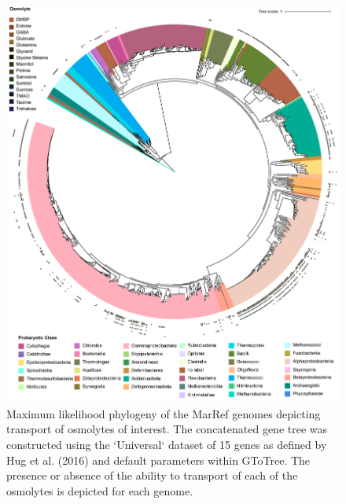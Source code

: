 \documentclass[utf8]{frontiers_suppmat} %
\begin{document}
\begin{figure}[ht]
    \centering
    \includegraphics[width=0.9\columnwidth]{Figures/SI-Bacterial-Phylogeny-Transport-01-01.png}
    \caption{Maximum likelihood phylogeny of the MarRef genomes depicting transport of osmolytes of interest. The concatenated gene tree was constructed using the `Universal` dataset of 15 genes as defined by Hug et al. (2016) and default parameters within GToTree. The presence or absence of the ability to transport of each of the osmolytes is depicted for each genome.
}
    \label{fig:phytrans}
\end{figure}
\end{document}
